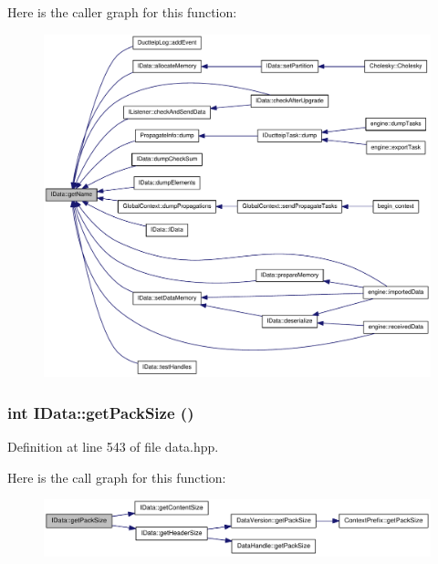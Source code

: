 Here is the caller graph for this function:\nopagebreak
\begin{figure}[H]
\begin{center}
\leavevmode
\includegraphics[width=346pt]{class_i_data_a87b7baa5c42fd4c2b36875141030880d_icgraph}
\end{center}
\end{figure}
\hypertarget{class_i_data_a98eb397df8b3cd27711801cb4c9e14ed}{
\subsubsection[{getPackSize}]{\setlength{\rightskip}{0pt plus 5cm}int IData::getPackSize ()}}
\label{class_i_data_a98eb397df8b3cd27711801cb4c9e14ed}


Definition at line 543 of file data.hpp.

Here is the call graph for this function:\nopagebreak
\begin{figure}[H]
\begin{center}
\leavevmode
\includegraphics[width=319pt]{class_i_data_a98eb397df8b3cd27711801cb4c9e14ed_cgraph}
\end{center}
\end{figure}


